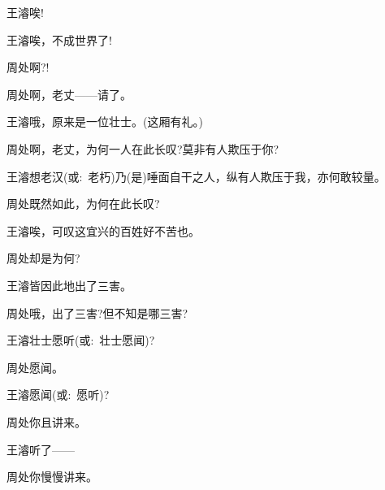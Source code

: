 {{{{王濬}\hspace{30pt}唉!


{王濬}\hspace{30pt}唉，不成世界了!

周处\hspace{30pt}啊?!


周处\hspace{30pt}啊，老丈------请了。

{王濬}\hspace{30pt}哦，原来是一位壮士。(这厢有礼。)

{周处\hspace{30pt}啊，老丈，为何一人在此长叹?莫非有人欺压于你?}

{王濬}\hspace{30pt}想老汉({\akai 或}:~老朽)乃(是)唾面自干之人，纵有人欺压于我，亦何敢较量。

{周处\hspace{30pt}既然如此，为何在此长叹?}

{王濬\hspace{30pt}唉，可叹这宜兴的百姓好不苦也。}

{周处\hspace{30pt}却是为何?}

王濬\hspace{30pt}皆因此地出了三害。

{周处\hspace{30pt}哦，出了三害?但不知是哪三害?}

王濬\hspace{30pt}壮士愿听({\akai 或}:~壮士愿闻)?

{周处\hspace{30pt}愿闻。}

王濬\hspace{30pt}愿闻({\akai 或}:~愿听)?

{周处\hspace{30pt}你且讲来。}

{王濬}\hspace{30pt}听了------


{周处\hspace{30pt}你慢慢讲来。}

}}}
